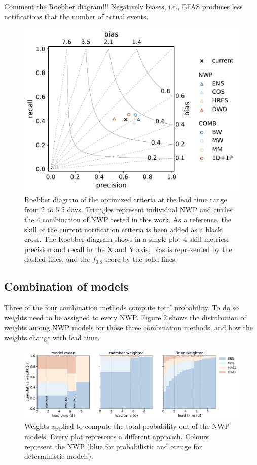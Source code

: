 \documentclass[preprint,12pt,authoryear]{elsarticle}
\begin{document}
Comment the Roebber diagram!!! Negatively biases, i.e., EFAS produces less notifications that the number of actual events.

\begin{figure}
    \centering
    \includegraphics[width=0.5\linewidth]{figures/roebber_fscore_60h.pdf}
    \caption{Roebber diagram of the optimized criteria at the lead time range from 2 to 5.5 days. Triangles represent individual NWP and circles the 4 combination of NWP tested in this work. As a reference, the skill of the current notification criteria is been added as a black cross. The Roebber diagram shows in a single plot 4 skill metrics: precision and recall in the X and Y axis, bias is represented by the dashed lines, and the $f_{0.8}$ score by the solid lines.} 
    \label{fig:roebber}
\end{figure}

\subsection{Combination of models}
\label{sec:results_COMB}

Three of the four combination methods compute total probability. To do so weights need to be assigned to every NWP. Figure \ref{fig:weights} shows the distribution of weights among NWP models for those three combination methods, and how the weights change with lead time.

\begin{figure}
    \centering
    \includegraphics[width=1\textwidth]{figures/weights.pdf}
    \caption{Weights applied to compute the total probability out of the NWP models. Every plot represents a different approach. Colours represent the NWP (blue for probabilistic and orange for deterministic models).}
    \label{fig:weights}
\end{figure}
\end{document}
